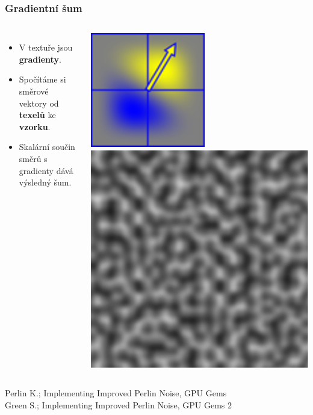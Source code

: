 \begin{frame}[fragile]
    \frametitle{Gradientní šum}
    \begin{columns}[c]
        \begin{itemize}
            \item V textuře jsou \textbf{gradienty}.
            \item Spočítáme si směrové vektory od \textbf{texelů} ke \textbf{vzorku}.
            \item Skalární součin směrů s gradienty dává výsledný šum.
        \end{itemize}
        \includegraphics[width=.5\textwidth]{pics/procedural/grad_noise.eps}
        \includegraphics[width=\textwidth]{pics/procedural/perlin_noise.eps}
    \end{columns}
    Perlin K.; Implementing Improved Perlin Noise, GPU Gems\\
    Green S.; Implementing Improved Perlin Noise, GPU Gems 2
\end{frame}

